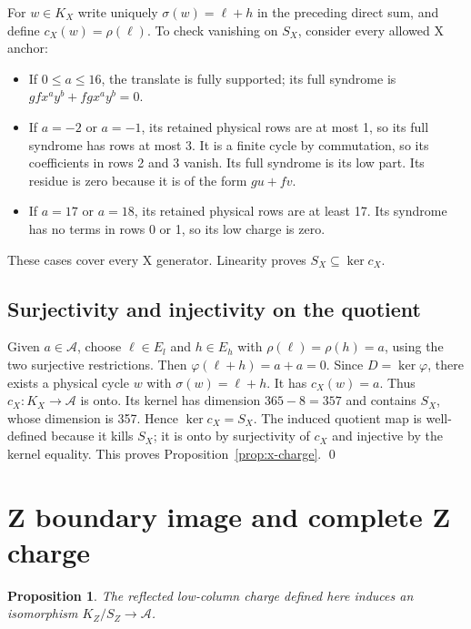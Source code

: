 \documentclass{article}
\newtheorem{proposition}{Proposition}
\begin{document}
For \(w\in K_X\) write uniquely \(\sigma(w)=\ell+h\) in the preceding
direct sum, and define \(c_X(w)=\rho(\ell)\).
To check vanishing on \(S_X\), consider every allowed X anchor:
\begin{itemize}
  \item If \(0\le a\le 16\), the translate is fully supported; its full
    syndrome is \(gfx^ay^b+fgx^ay^b=0\).
  \item If \(a=-2\) or \(a=-1\), its retained physical rows are at most 1, so
    its full syndrome has rows at most 3. It is a finite cycle by
    commutation, so its coefficients in rows 2 and 3 vanish.
    Its full syndrome is its low part. Its residue is zero because it is
    of the form \(gu+fv\).
  \item If \(a=17\) or \(a=18\), its retained physical rows are at least 17.
    Its syndrome has no terms in rows 0 or 1, so its low charge is zero.
\end{itemize}

These cases cover every X generator. Linearity proves
\(S_X\subseteq\ker c_X\).

\subsection{Surjectivity and injectivity on the quotient}\label{sec:x-quotient}

Given \(a\in\mathcal{A}\), choose \(\ell\in E_l\) and \(h\in E_h\) with
\(\rho(\ell)=\rho(h)=a\), using the two surjective restrictions.
Then \(\varphi(\ell+h)=a+a=0\). Since \(D=\ker\varphi\), there exists a
physical cycle \(w\) with \(\sigma(w)=\ell+h\). It has \(c_X(w)=a\).
Thus \(c_X\colon K_X\to\mathcal{A}\) is onto.
Its kernel has dimension \(365-8=357\) and contains \(S_X\), whose
dimension is 357. Hence \(\ker c_X=S_X\).
The induced quotient map is well-defined because it kills \(S_X\);
it is onto by surjectivity of \(c_X\) and injective by the kernel equality.
This proves Proposition~\ref{prop:x-charge}. \qed

\section{Z boundary image and complete Z charge}\label{sec:z-charge}

\begin{proposition}\label{prop:z-charge}
  The reflected low-column charge defined here induces an isomorphism
  \(K_Z/S_Z\to\mathcal{A}\).
\end{proposition}
\end{document}
